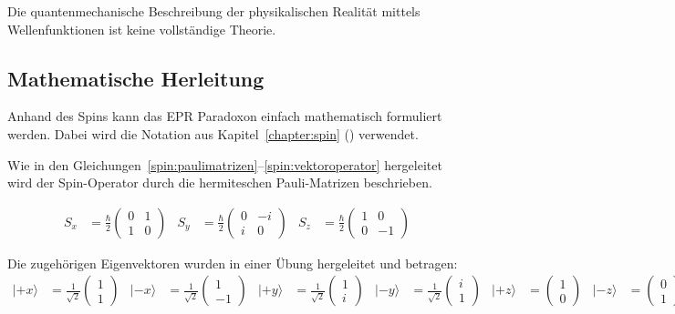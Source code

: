 \begin{refsection}
\begin{satz}
    Die quantenmechanische Beschreibung der physikalischen Realit\"at mittels
    Wellenfunktionen ist keine vollst\"andige Theorie.
\end{satz}

\subsection{Mathematische Herleitung\label{subsection:bell:epr:herleitung}}
Anhand des Spins kann das EPR Paradoxon einfach mathematisch formuliert werden.
Dabei wird die Notation aus Kapitel~\ref{chapter:spin} ()
verwendet.

Wie in den Gleichungen~\ref{spin:paulimatrizen}--\ref{spin:vektoroperator}
hergeleitet wird der Spin-Operator durch die hermiteschen Pauli-Matrizen
beschrieben.

\begin{align}
    S_x &= \frac{\hbar}{2} \begin{pmatrix}
    0 & 1 \\ 1 & 0
    \end{pmatrix}
    &
    S_y &= \frac{\hbar}{2} \begin{pmatrix}
    0 & -i \\ i & 0
    \end{pmatrix}
    &
    S_z &= \frac{\hbar}{2} \begin{pmatrix}
    1 & 0 \\ 0 & -1
    \end{pmatrix}\label{equ:bell:paulimatrizen}
\end{align}

Die zugeh\"origen Eigenvektoren wurden in einer \"Ubung hergeleitet und
betragen:
\begin{align}
    |{+}x\rangle &= \frac{1}{\sqrt{2}}\begin{pmatrix} 1\\1 \end{pmatrix} &
    |{-}x\rangle &= \frac{1}{\sqrt{2}}\begin{pmatrix} 1\\-1 \end{pmatrix} &
    |{+}y\rangle &= \frac{1}{\sqrt{2}}\begin{pmatrix} 1\\i \end{pmatrix} &
    |{-}y\rangle &= \frac{1}{\sqrt{2}}\begin{pmatrix} i\\1 \end{pmatrix} &
    |{+}z\rangle &= \begin{pmatrix} 1\\0 \end{pmatrix} &
    |{-}z\rangle &= \begin{pmatrix} 0\\1 \end{pmatrix} &
\end{align}


\end{refsection}
